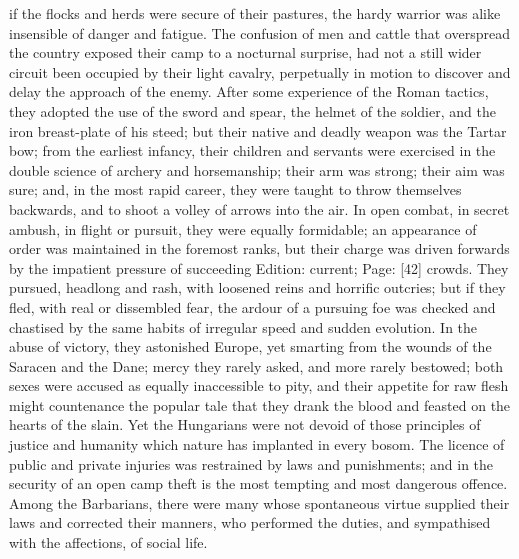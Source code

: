 if the flocks and herds were secure of their pastures, the hardy warrior was alike insensible of danger and fatigue. The confusion of men and cattle that overspread the country exposed their camp to a nocturnal surprise, had not a still wider circuit been occupied by their light cavalry, perpetually in motion to discover and delay the approach of the enemy. After some experience of the Roman tactics, they adopted the use of the sword and spear, the helmet of the soldier, and the iron breast-plate of his steed; but their native and deadly weapon was the Tartar bow; from the earliest infancy, their children and servants were exercised in the double science of archery and horsemanship; their arm was strong; their aim was sure; and, in the most rapid career, they were taught to throw themselves backwards, and to shoot a volley of arrows into the air. In open combat, in secret ambush, in flight or pursuit, they were equally formidable; an appearance of order was maintained in the foremost ranks, but their charge was driven forwards by the impatient pressure of succeeding Edition: current; Page: [42] crowds. They pursued, headlong and rash, with loosened reins and horrific outcries; but if they fled, with real or dissembled fear, the ardour of a pursuing foe was checked and chastised by the same habits of irregular speed and sudden evolution. In the abuse of victory, they astonished Europe, yet smarting from the wounds of the Saracen and the Dane; mercy they rarely asked, and more rarely bestowed; both sexes were accused as equally inaccessible to pity, and their appetite for raw flesh might countenance the popular tale that they drank the blood and feasted on the hearts of the slain. Yet the Hungarians were not devoid of those principles of justice and humanity which nature has implanted in every bosom. The licence of public and private injuries was restrained by laws and punishments; and in the security of an open camp theft is the most tempting and most dangerous offence. Among the Barbarians, there were many whose spontaneous virtue supplied their laws and corrected their manners, who performed the duties, and sympathised with the affections, of social life.

